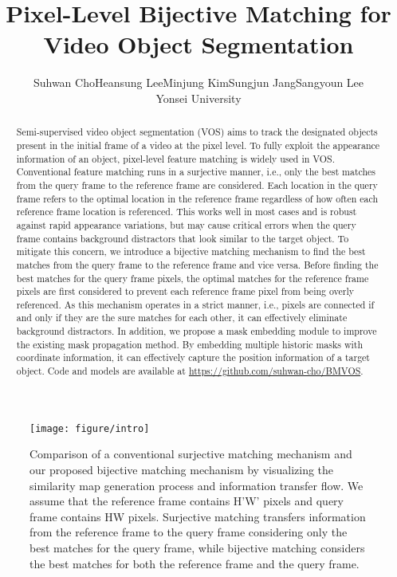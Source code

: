 \documentclass[10pt,twocolumn,letterpaper]{article}
\begin{document}
	\title{Pixel-Level Bijective Matching for Video Object Segmentation}
	\author{Suhwan Cho\quad Heansung Lee\quad Minjung Kim\quad Sungjun Jang\quad Sangyoun Lee\vspace{0.5cm}\\
		Yonsei University\\}
	\maketitle
	

\begin{abstract}
		Semi-supervised video object segmentation (VOS) aims to track the designated objects present in the initial frame of a video at the pixel level. To fully exploit the appearance information of an object, pixel-level feature matching is widely used in VOS. Conventional feature matching runs in a surjective manner, i.e., only the best matches from the query frame to the reference frame are considered. Each location in the query frame refers to the optimal location in the reference frame regardless of how often each reference frame location is referenced. This works well in most cases and is robust against rapid appearance variations, but may cause critical errors when the query frame contains background distractors that look similar to the target object. To mitigate this concern, we introduce a bijective matching mechanism to find the best matches from the query frame to the reference frame and vice versa. Before finding the best matches for the query frame pixels, the optimal matches for the reference frame pixels are first considered to prevent each reference frame pixel from being overly referenced. As this mechanism operates in a strict manner, i.e., pixels are connected if and only if they are the sure matches for each other, it can effectively eliminate background distractors. In addition, we propose a mask embedding module to improve the existing mask propagation method. By embedding multiple historic masks with coordinate information, it can effectively capture the position information of a target object. Code and models are available at \url{https://github.com/suhwan-cho/BMVOS}.
		
		
	\end{abstract}
	
	\begin{figure}[t]
		\centering
		\texttt{[image: figure/intro]}
		\caption{Comparison of a conventional surjective matching mechanism and our proposed bijective matching mechanism by visualizing the similarity map generation process and information transfer flow. We assume that the reference frame contains H'W' pixels and query frame contains HW pixels. Surjective matching transfers information from the reference frame to the query frame considering only the best matches for the query frame, while bijective matching considers the best matches for both the reference frame and the query frame.}
		\label{figure1}
	\end{figure}
	
\end{document}
